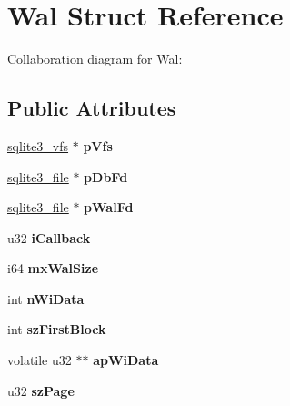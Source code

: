 \hypertarget{struct_wal}{\section{Wal Struct Reference}
\label{struct_wal}
}


Collaboration diagram for Wal\+:
\subsection*{Public Attributes}
\begin{DoxyCompactItemize}
\item 
\hypertarget{struct_wal_a5431b060acbc998a7e3710587abaa11e}{\hyperlink{structsqlite3__vfs}{sqlite3\+\_\+vfs} $\ast$ {\bfseries p\+Vfs}}\label{struct_wal_a5431b060acbc998a7e3710587abaa11e}

\item 
\hypertarget{struct_wal_a3a4d051c55228e554b36691c5095ed14}{\hyperlink{structsqlite3__file}{sqlite3\+\_\+file} $\ast$ {\bfseries p\+Db\+Fd}}\label{struct_wal_a3a4d051c55228e554b36691c5095ed14}

\item 
\hypertarget{struct_wal_aea2a72ead42cfe57e3a6809e80884397}{\hyperlink{structsqlite3__file}{sqlite3\+\_\+file} $\ast$ {\bfseries p\+Wal\+Fd}}\label{struct_wal_aea2a72ead42cfe57e3a6809e80884397}

\item 
\hypertarget{struct_wal_aae230a2317817739a5f08ebb28b644b0}{u32 {\bfseries i\+Callback}}\label{struct_wal_aae230a2317817739a5f08ebb28b644b0}

\item 
\hypertarget{struct_wal_a413f9f82c15d31627a2ed6eac9b6cc27}{i64 {\bfseries mx\+Wal\+Size}}\label{struct_wal_a413f9f82c15d31627a2ed6eac9b6cc27}

\item 
\hypertarget{struct_wal_ae3e69420adab92acd90dd7c03d37815f}{int {\bfseries n\+Wi\+Data}}\label{struct_wal_ae3e69420adab92acd90dd7c03d37815f}

\item 
\hypertarget{struct_wal_a901c02626270f4d51db89786e4994da9}{int {\bfseries sz\+First\+Block}}\label{struct_wal_a901c02626270f4d51db89786e4994da9}

\item 
\hypertarget{struct_wal_a2b0078e3adfd1fb21794561bb12bbfac}{volatile u32 $\ast$$\ast$ {\bfseries ap\+Wi\+Data}}\label{struct_wal_a2b0078e3adfd1fb21794561bb12bbfac}

\item 
\hypertarget{struct_wal_a771c3a8c81326babc7d623255a6034c5}{u32 {\bfseries sz\+Page}}\label{struct_wal_a771c3a8c81326babc7d623255a6034c5}


\end{DoxyCompactItemize}
